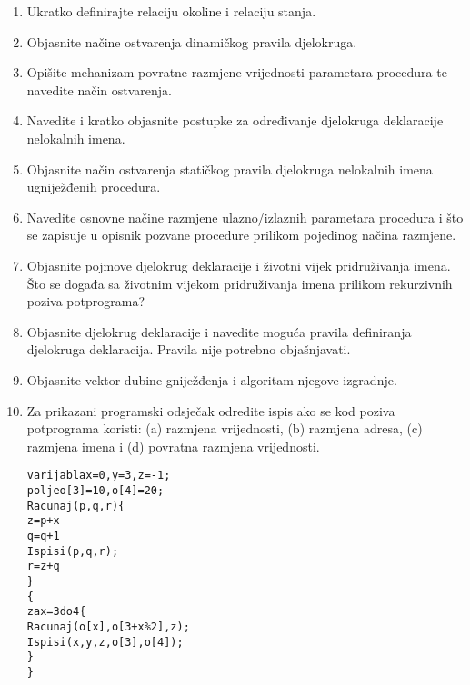 \documentclass[times, 12pt, utf8]{book}
\begin{document}
\begin{enumerate}[resume]
\item
Ukratko definirajte relaciju okoline i relaciju stanja. \cite[str.~221-222]{udzbenik}

\item
Objasnite načine ostvarenja dinamičkog pravila djelokruga. \cite[str.~241-242]{udzbenik}

\item
Opišite mehanizam povratne razmjene vrijednosti parametara procedura te navedite način ostvarenja. \cite[str.~243-252]{udzbenik}

\item
Navedite i kratko objasnite postupke za određivanje djelokruga deklaracije nelokalnih imena. \cite[str.~236-241]{udzbenik}

\item
Objasnite način ostvarenja statičkog pravila djelokruga nelokalnih imena ugniježđenih procedura. \cite[str.~236-241]{udzbenik}

\item
Navedite osnovne načine razmjene ulazno/izlaznih parametara procedura i što se zapisuje u opisnik pozvane procedure prilikom pojedinog načina razmjene. \cite[str.~243-244]{udzbenik}

\item
Objasnite pojmove djelokrug deklaracije i životni vijek pridruživanja imena.
Što se događa sa životnim vijekom pridruživanja imena prilikom rekurzivnih poziva potprograma? \cite[str.~233-234]{udzbenik}

\item
Objasnite djelokrug deklaracije i navedite moguća pravila definiranja djelokruga deklaracija.
Pravila nije potrebno objašnjavati. \cite[str.~233-234]{udzbenik}

\item
Objasnite vektor dubine gniježđenja i algoritam njegove izgradnje. \cite[str.~239]{udzbenik}

\item
Za prikazani programski odsječak odredite ispis ako se kod poziva potprograma koristi: (a) razmjena vrijednosti, (b) razmjena adresa, (c) razmjena imena i (d) povratna razmjena vrijednosti. \cite[str.~243-252]{udzbenik} \cite{auditorne}

\begin{alltt}
varijabla x=0, y=3, z=-1;
polje o[3]=10, o[4]=20;
  Racunaj(p, q, r) \verb|{|
   z = p + x
   q = q + 1
   Ispisi(p, q, r);
   r = z + q
  \verb|}|
\verb|{|
  za x = 3 do 4 \verb|{|
    Racunaj(o[x], o[3+x\%2], z);
    Ispisi(x, y, z, o[3], o[4]);
  \verb|}|
\verb|}|
\end{alltt} 


\end{enumerate}
\end{document}
